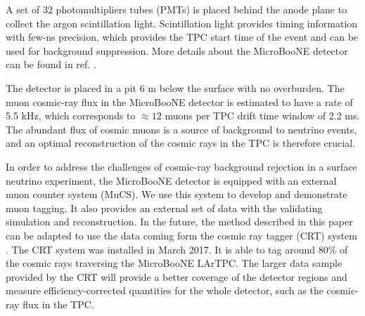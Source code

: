 \documentclass[a4paper,11pt]{article}
\begin{document}
A set of 32 photomultipliers tubes (PMTs) is placed behind the anode plane to collect the argon scintillation light. Scintillation light provides timing information with few-ns precision, which provides the TPC start time of the event and can be used for background suppression. More details about the MicroBooNE detector can be found in ref. \cite{detector}.

The detector is placed in a pit 6 m below the surface with no overburden. The muon cosmic-ray flux in the MicroBooNE detector is estimated to have a rate of 5.5 kHz, which corresponds to $\approx12$ muons per TPC drift time window of 2.2 ms. The abundant flux of cosmic muons is a source of background to neutrino events, and an optimal reconstruction of the cosmic rays in the TPC is therefore crucial.

In order to address the challenges of cosmic-ray background rejection in a surface neutrino experiment, the MicroBooNE detector is equipped with an external muon counter system (MuCS). We use this system to develop and demonstrate muon tagging. It also provides an external set of data with the validating simulation and reconstruction.
In the future, the method described in this paper can be adapted to use the data coming form the cosmic ray tagger (CRT) system \cite{crt}. The CRT system was installed in March 2017. It is able to tag around $80\%$ of the cosmic rays traversing the MicroBooNE LArTPC. The larger data sample provided by the CRT will provide a better coverage of the detector regions  and measure efficiency-corrected quantities for the whole detector, such as the cosmic-ray flux in the TPC.


\end{document}
